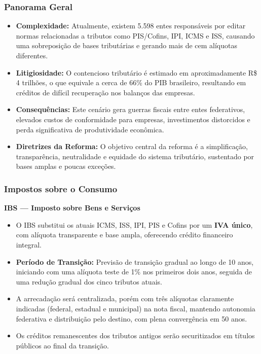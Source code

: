 \documentclass[a4paper,12pt]{article}[abntex2]
\begin{document}
\subsubsection{\textbf{Panorama Geral}}

\begin{itemize}
  \item \textbf{Complexidade:} Atualmente, existem 5.598 entes responsáveis por editar normas relacionadas a tributos como PIS/Cofins, IPI, ICMS e ISS, causando uma sobreposição de bases tributárias e gerando mais de cem alíquotas diferentes.
  \item \textbf{Litigiosidade:} O contencioso tributário é estimado em aproximadamente R\$ 4 trilhões, o que equivale a cerca de 66\% do PIB brasileiro, resultando em créditos de difícil recuperação nos balanços das empresas.
  \item \textbf{Consequências:} Este cenário gera guerras fiscais entre entes federativos, elevados custos de conformidade para empresas, investimentos distorcidos e perda significativa de produtividade econômica.
  \item \textbf{Diretrizes da Reforma:} O objetivo central da reforma é a simplificação, transparência, neutralidade e equidade do sistema tributário, sustentado por bases amplas e poucas exceções.
\end{itemize}

\subsubsection{\textbf{Impostos sobre o Consumo}}

\textbf{IBS — Imposto sobre Bens e Serviços}

\begin{itemize}
  \item O IBS substitui os atuais ICMS, ISS, IPI, PIS e Cofins por um \textbf{IVA único}, com alíquota transparente e base ampla, oferecendo crédito financeiro integral.
  \item \textbf{Período de Transição:} Previsão de transição gradual ao longo de 10 anos, iniciando com uma alíquota teste de 1\% nos primeiros dois anos, seguida de uma redução gradual dos cinco tributos atuais.
  \item A arrecadação será centralizada, porém com três alíquotas claramente indicadas (federal, estadual e municipal) na nota fiscal, mantendo autonomia federativa e distribuição pelo destino, com plena convergência em 50 anos.
  \item Os créditos remanescentes dos tributos antigos serão securitizados em títulos públicos ao final da transição.
\end{itemize}
\end{document}
